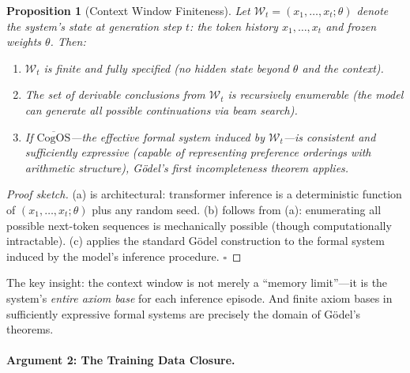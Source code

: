 \documentclass[11pt]{article}
\newtheorem{proposition}{Proposition}
\newcommand{\CogOS}{\text{CogOS}}
\begin{document}
\begin{proposition}[Context Window Finiteness]
\label{prop:context-finite}
Let $\mathcal{W}_t = (x_1, \ldots, x_t; \theta)$ denote the system's state at
generation step $t$: the token history $x_1, \ldots, x_t$ and frozen weights
$\theta$. Then:
\begin{enumerate}
\item[(a)] $\mathcal{W}_t$ is finite and fully specified (no hidden state
      beyond $\theta$ and the context).
\item[(b)] The set of derivable conclusions from $\mathcal{W}_t$ is
      recursively enumerable (the model can generate all possible continuations
      via beam search).
\item[(c)] If $\overline{\CogOS}$---the effective formal system induced by
      $\mathcal{W}_t$---is consistent and sufficiently expressive (capable of
      representing preference orderings with arithmetic structure), G\"{o}del's
      first incompleteness theorem applies.
\end{enumerate}
\end{proposition}

\begin{proof}[Proof sketch]
(a) is architectural: transformer inference is a deterministic function of
$(x_1, \ldots, x_t; \theta)$ plus any random seed. (b) follows from (a):
enumerating all possible next-token sequences is mechanically possible (though
computationally intractable). (c) applies the standard G\"{o}del construction
to the formal system induced by the model's inference procedure.
\hfill $\square$
\end{proof}

\noindent The key insight: the context window is not merely a ``memory
limit''---it is the system's \textit{entire axiom base} for each inference
episode. And finite axiom bases in sufficiently expressive formal systems are
precisely the domain of G\"{o}del's theorems.

\paragraph{Argument 2: The Training Data Closure.}
\end{document}
